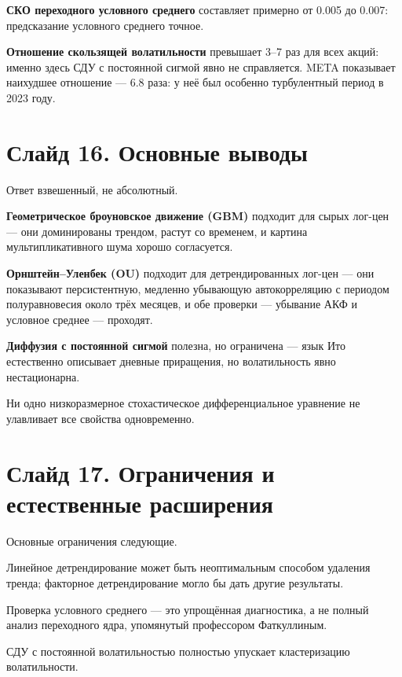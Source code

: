\documentclass[12pt,a4paper]{article}
\begin{document}
\textbf{СКО переходного условного среднего}
составляет примерно от 0.005 до 0.007:
предсказание условного среднего точное.

\textbf{Отношение скользящей волатильности} превышает 3--7 раз для всех акций:
именно здесь СДУ с постоянной сигмой явно не справляется.
META показывает наихудшее отношение --- 6.8 раза:
у неё был особенно турбулентный период в 2023 году.

\section{Слайд 16. Основные выводы}

Ответ взвешенный, не абсолютный.

\textbf{Геометрическое броуновское движение (GBM)} подходит для сырых лог-цен ---
они доминированы трендом, растут со временем,
и картина мультипликативного шума хорошо согласуется.

\textbf{Орнштейн--Уленбек (OU)} подходит для детрендированных лог-цен ---
они показывают персистентную, медленно убывающую автокорреляцию
с периодом полуравновесия около трёх месяцев,
и обе проверки --- убывание АКФ и условное среднее --- проходят.

\textbf{Диффузия с постоянной сигмой} полезна, но ограничена ---
язык Ито естественно описывает дневные приращения,
но волатильность явно нестационарна.

Ни одно низкоразмерное стохастическое дифференциальное уравнение
не улавливает все свойства одновременно.

\section{Слайд 17. Ограничения и естественные расширения}

Основные ограничения следующие.

Линейное детрендирование может быть неоптимальным способом удаления тренда;
факторное детрендирование могло бы дать другие результаты.

Проверка условного среднего --- это упрощённая диагностика,
а не полный анализ переходного ядра, упомянутый профессором Фаткуллиным.

СДУ с постоянной волатильностью полностью упускает кластеризацию волатильности.
\end{document}
